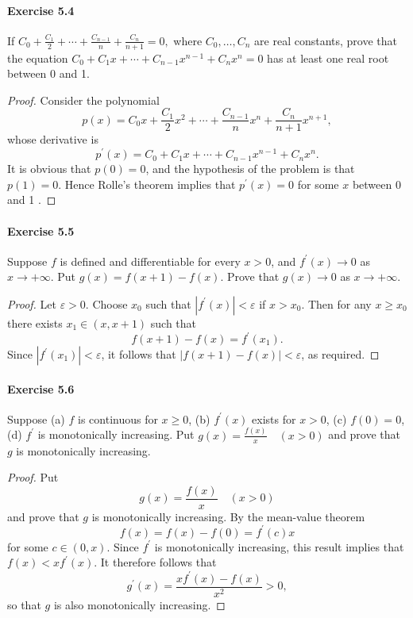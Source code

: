 \documentclass{article}
\theoremstyle{definition}
\begin{document}
\paragraph{Exercise 5.4} If $C_{0}+\frac{C_{1}}{2}+\cdots+\frac{C_{n-1}}{n}+\frac{C_{n}}{n+1}=0,$ where $C_{0}, \ldots, C_{n}$ are real constants, prove that the equation $C_{0}+C_{1} x+\cdots+C_{n-1} x^{n-1}+C_{n} x^{n}=0$ has at least one real root between 0 and 1.
\begin{proof}
    Consider the polynomial
$$
p(x)=C_0 x+\frac{C_1}{2} x^2+\cdots+\frac{C_{n-1}}{n} x^n+\frac{C_n}{n+1} x^{n+1},
$$
whose derivative is
$$
p^{\prime}(x)=C_0+C_1 x+\cdots+C_{n-1} x^{n-1}+C_n x^n .
$$
It is obvious that $p(0)=0$, and the hypothesis of the problem is that $p(1)=0$. Hence Rolle's theorem implies that $p^{\prime}(x)=0$ for some $x$ between 0 and 1 .
\end{proof}


\paragraph{Exercise 5.5} Suppose $f$ is defined and differentiable for every $x>0$, and $f^{\prime}(x) \rightarrow 0$ as $x \rightarrow+\infty$. Put $g(x)=f(x+1)-f(x)$. Prove that $g(x) \rightarrow 0$ as $x \rightarrow+\infty$.
\begin{proof}
    Let $\varepsilon>0$. Choose $x_0$ such that $\left|f^{\prime}(x)\right|<\varepsilon$ if $x>x_0$. Then for any $x \geq x_0$ there exists $x_1 \in(x, x+1)$ such that
$$
f(x+1)-f(x)=f^{\prime}\left(x_1\right) .
$$
Since $\left|f^{\prime}\left(x_1\right)\right|<\varepsilon$, it follows that $|f(x+1)-f(x)|<\varepsilon$, as required.
\end{proof}


\paragraph{Exercise 5.6} Suppose (a) $f$ is continuous for $x \geq 0$, (b) $f^{\prime}(x)$ exists for $x>0$, (c) $f(0)=0$, (d) $f^{\prime}$ is monotonically increasing. Put $g(x)=\frac{f(x)}{x} \quad(x>0)$ and prove that $g$ is monotonically increasing.
\begin{proof}
    Put
$$
g(x)=\frac{f(x)}{x} \quad(x>0)
$$
and prove that $g$ is monotonically increasing.
By the mean-value theorem
$$
f(x)=f(x)-f(0)=f^{\prime}(c) x
$$
for some $c \in(0, x)$. Since $f^{\prime}$ is monotonically increasing, this result implies that $f(x)<x f^{\prime}(x)$. It therefore follows that
$$
g^{\prime}(x)=\frac{x f^{\prime}(x)-f(x)}{x^2}>0,
$$
so that $g$ is also monotonically increasing.
\end{proof}
\end{document}
